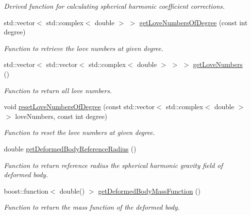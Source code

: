 \begin{DoxyCompactItemize}
\begin{DoxyCompactList}\small\item\em Derived function for calculating spherical harmonic coefficient corrections. \end{DoxyCompactList}\item 
std\+::vector$<$ std\+::complex$<$ double $>$ $>$ \hyperlink{classtudat_1_1gravitation_1_1BasicSolidBodyTideGravityFieldVariations_a1a189f3f9b2f735519842f5a939065fb}{get\+Love\+Numbers\+Of\+Degree} (const int degree)
\begin{DoxyCompactList}\small\item\em Function to retrieve the love numbers at given degree. \end{DoxyCompactList}\item 
std\+::vector$<$ std\+::vector$<$ std\+::complex$<$ double $>$ $>$ $>$ \hyperlink{classtudat_1_1gravitation_1_1BasicSolidBodyTideGravityFieldVariations_a9e0d798403383edfea5f3a8e546e405f}{get\+Love\+Numbers} ()
\begin{DoxyCompactList}\small\item\em Function to return all love numbers. \end{DoxyCompactList}\item 
void \hyperlink{classtudat_1_1gravitation_1_1BasicSolidBodyTideGravityFieldVariations_a7e52b6a1d0a419927f27e3fe5468a8d3}{reset\+Love\+Numbers\+Of\+Degree} (const std\+::vector$<$ std\+::complex$<$ double $>$ $>$ love\+Numbers, const int degree)
\begin{DoxyCompactList}\small\item\em Function to reset the love numbers at given degree. \end{DoxyCompactList}\item 
double \hyperlink{classtudat_1_1gravitation_1_1BasicSolidBodyTideGravityFieldVariations_a7d18c02f68c969a278704db689631e2a}{get\+Deformed\+Body\+Reference\+Radius} ()
\begin{DoxyCompactList}\small\item\em Function to return reference radius the spherical harmonic gravity field of deformed body. \end{DoxyCompactList}\item 
boost\+::function$<$ double() $>$ \hyperlink{classtudat_1_1gravitation_1_1BasicSolidBodyTideGravityFieldVariations_af3a99ebffc6c259fd662fd24d521aa2a}{get\+Deformed\+Body\+Mass\+Function} ()
\begin{DoxyCompactList}\small\item\em Function to return the mass function of the deformed body. \end{DoxyCompactList}\item 

\end{DoxyCompactItemize}
